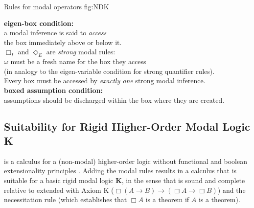 \documentclass[smallextended]{svjour3}
\newcommand{\imp}{\rightarrow}
\newcommand{\nec}{\Box} %
\newcommand{\pos}{\Diamond} %
\begin{document}
\begin{calculus}
{Rules for modal operators}
{fig:NDK}

\vspace{1em}

\s\s\s\s\s\s
\infer[\nec_I]{\nec A}{\omega: \fbox{\infer*{A}{}} }
\s\s\s\s
\infer[\nec_E]{w: \fbox{ \infer*{}{A} } }{\nec A}

\vspace{2em}

\s\s\s\s\s\s
\infer[\pos_I]{\pos A}{w: \fbox{\infer*{A}{}} }
\s\s\s\s
\infer[\pos_E]{\omega: \fbox{ \infer*{}{A} } }{\pos A}

\vspace{1em}


\begin{center}
\textbf{eigen-box condition:}\\ 
a modal inference is said to \emph{access}\\
 the box immediately above or below it. \\
$\nec_I$ and $\pos_E$ are \emph{strong} modal rules: \\
$\omega$ must be a fresh name for the box they access \\ 
(in analogy to the eigen-variable condition for strong quantifier rules). \\
Every box must be accessed by \emph{exactly one} strong modal inference. \\
\vspace{0.5em}
\textbf{boxed assumption condition:} \\
assumptions should be discharged within the box where they are created.
\end{center}

\vspace{1em}

\end{calculus}


\subsection{Suitability for Rigid Higher-Order Modal Logic K}\label{sec:compl-sound}

{\ND} is a calculus for a (non-modal) higher-order logic without 
functional and boolean extensionality principles \citep{BenzmuellerBrownKohlhase}.
Adding the modal rules results in a calculus that is suitable for a basic rigid modal logic \textbf{K}, in the sense that {\NDK} is sound and complete relative to {\ND} extended with Axiom K ($\nec(A\imp B)\imp (\nec A\imp \nec B)$) and the necessitation rule (which establishes that $\nec A$ is a theorem if $A$ is a theorem).
\end{document}
